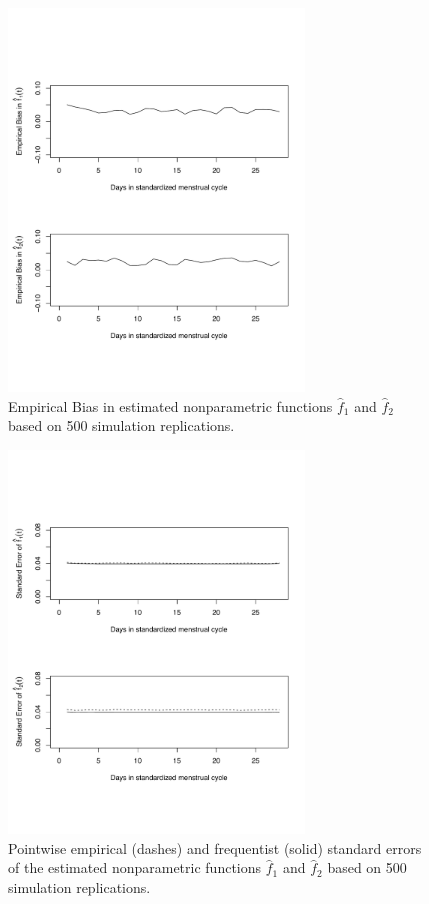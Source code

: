 \documentclass[review]{elsarticle}
\begin{document}
\begin{figure}[h!]
\centering
\includegraphics[width=0.7\textwidth]{bivNOU_liu_Biasf.pdf}
\caption{Empirical Bias in estimated nonparametric functions $\hat f_1$ and $\hat f_2$ based on 500 simulation replications.}
\label{Biasf}
\end{figure}

\begin{figure}[h!]
\centering
\includegraphics[width=0.7\textwidth]{bivNOU_liu_SEf.pdf}
\caption{Pointwise empirical (dashes) and frequentist (solid) standard errors of the estimated nonparametric functions $\hat f_1$ and $\hat f_2$ based on 500 simulation replications.}
\label{SEf}
\end{figure}
\end{document}
